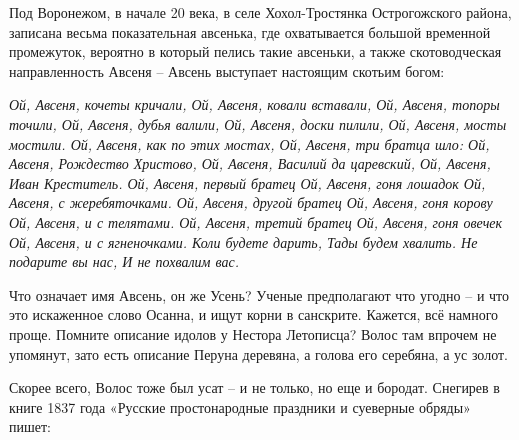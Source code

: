 Под Воронежом, в начале 20 века, в селе Хохол-Тростянка Острогожского района, записана весьма показательная авсенька, где охватывается большой временной промежуток, вероятно в который пелись такие авсеньки, а также скотоводческая направленность Авсеня – Авсень выступает настоящим скотьим богом:

\textit{\noindent Ой, Авсеня, кочеты кричали,\newline 
Ой, Авсеня, ковали вставали,\newline 
Ой, Авсеня, топоры точили,\newline 
Ой, Авсеня, дубья валили,\newline 
Ой, Авсеня, доски пилили,\newline 
Ой, Авсеня, мосты мостили.\newline 
Ой, Авсеня, как по этих мостах,\newline 
Ой, Авсеня, три братца шло:\newline 
Ой, Авсеня, Рождество Христово, \newline
Ой, Авсеня, Василий да царевский, \newline
Ой, Авсеня, Иван Креститель. \newline
Ой, Авсеня, первый братец\newline
Ой, Авсеня, гоня лошадок \newline
Ой, Авсеня, с жеребяточками.\newline 
Ой, Авсеня, другой братец \newline
Ой, Авсеня, гоня корову \newline
Ой, Авсеня, и с телятами. \newline
Ой, Авсеня, третий братец \newline
Ой, Авсеня, гоня овечек \newline
Ой, Авсеня, и с ягненочками. \newline
Коли будете дарить, \newline
Тады будем хвалить. \newline
Не подарите вы нас, \newline
И не похвалим вас.\newline}

   Что означает имя Авсень, он же Усень? Ученые предполагают что угодно – и что это искаженное слово Осанна, и ищут корни в санскрите. Кажется, всё намного проще. Помните описание идолов у Нестора Летописца? Волос там впрочем не упомянут, зато есть описание Перуна деревяна, а голова его серебяна, а ус золот.

   Скорее всего, Волос тоже был усат – и не только, но еще и бородат. Снегирев в книге 1837 года «Русские простонародные праздники и суеверные обряды» пишет:

